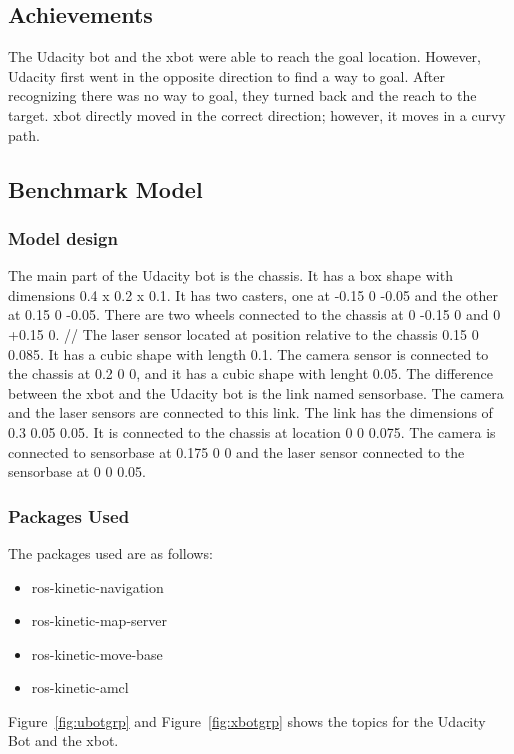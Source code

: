 \documentclass[10pt,journal,compsoc]{IEEEtran}
\begin{document}
\subsection{Achievements}
The Udacity bot and the xbot were able to reach the goal location. However, Udacity first went in the opposite direction to find a way to goal. After recognizing there was no way to goal, they turned back and the reach to the target. xbot directly moved in the correct direction; however, it moves in a curvy path.

\subsection{Benchmark Model}
\subsubsection{Model design}
The main part of the Udacity bot is the chassis. It has a box shape with dimensions 0.4 x 0.2 x 0.1. It has two casters, one at -0.15 0 -0.05 and the other at 0.15 0 -0.05. There are two wheels connected to the chassis at 0 -0.15 0 and 0 +0.15 0. //
The laser sensor located at position relative to the chassis 0.15 0 0.085. It has a cubic shape with length 0.1. The camera sensor is connected to the chassis at 0.2 0 0, and it has a cubic shape with lenght 0.05.
The difference between the xbot and the Udacity bot is the link named sensor\textunderscore base. The camera and the laser sensors are connected to this link. The link has the dimensions of 0.3 0.05 0.05. It is connected to the chassis at location 0 0 0.075. The camera is connected to sensor\textunderscore base at 0.175 0 0 and the laser sensor connected to the sensor\textunderscore base at 0 0 0.05.

\subsubsection{Packages Used}
The packages used are as follows:
\begin{itemize}
\item ros-kinetic-navigation
\item ros-kinetic-map-server
\item ros-kinetic-move-base
\item ros-kinetic-amcl
\end{itemize}

Figure~\ref{fig:ubotgrp} and Figure~\ref{fig:xbotgrp} shows the topics for the Udacity Bot and the xbot.
\end{document}
